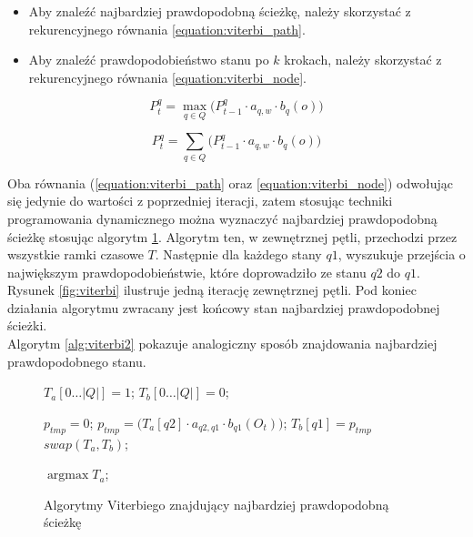 \documentclass[shortabstract, mgr]{iithesis}
\DeclareMathOperator*{\argmax}{\arg\max}   %
\begin{document}
		   \begin{itemize}
			   	\item Aby znaleźć najbardziej prawdopodobną ścieżkę, należy skorzystać z rekurencyjnego równania \ref{equation:viterbi_path}.
			   	\item Aby znaleźć prawdopodobieństwo stanu po $k$ krokach, należy skorzystać z rekurencyjnego równania \ref{equation:viterbi_node}.
		   \end{itemize}
	   	   
		   \begin{equation}
		   P_t^q=\max_{q \in Q} \bigg( P_{t-1}^q\cdot a_{q,w}\cdot b_q(o) \bigg)
		   \label{equation:viterbi_path}
		   \end{equation}
		   
		   \begin{equation}
		   P_t^q=\sum_{q \in Q} \bigg( P_{t-1}^q\cdot a_{q,w}\cdot b_q(o) \bigg)
		   \label{equation:viterbi_node}
		   \end{equation}
		   
		  Oba równania (\ref{equation:viterbi_path} oraz \ref{equation:viterbi_node}) odwołując się jedynie do wartości z poprzedniej iteracji, zatem stosując techniki programowania dynamicznego można wyznaczyć najbardziej prawdopodobną ścieżkę stosując algorytm \ref{alg:viterbi}. Algorytm ten, w zewnętrznej pętli, przechodzi przez wszystkie ramki czasowe $T$. Następnie dla każdego stany $q1$, wyszukuje przejścia o największym prawdopodobieństwie, które doprowadziło ze stanu $q2$ do $q1$. Rysunek \ref{fig:viterbi} ilustruje jedną iterację zewnętrznej pętli. Pod koniec działania algorytmu zwracany jest końcowy stan najbardziej prawdopodobnej ścieżki. \\
		  Algorytm \ref{alg:viterbi2} pokazuje analogiczny sposób znajdowania najbardziej prawdopodobnego stanu.
		
		  \begin{figure}
			   \begin{algorithmic}[1]
				   	
					   	
					   	\STATE $T_a[0 \ldots |Q|] = 1$;
					   	\STATE $T_b[0 \ldots |Q|] = 0$;
					   	
							   	\STATE $p_{tmp} = 0$;
									   	\STATE $p_{tmp} = \bigg( T_a[q2]\cdot a_{q2,q1}\cdot b_{q1}(O_t) \bigg)$;
								   	\ENDIF
							   	\ENDFOR
							   	\STATE $T_b[q1] = p_{tmp}$
						   	\ENDFOR
						   	\STATE $swap(T_a, T_b)$;
					   	\ENDFOR
					   	
					   	\RETURN $\argmax{T_a}$;
			   \end{algorithmic}
		  \caption{Algorytmy Viterbiego znajdujący najbardziej prawdopodobną ścieżkę}
		  \label{alg:viterbi}
		  \end{figure}		
	  
\end{document}
